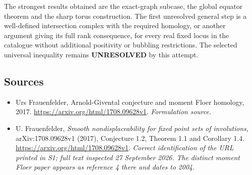 \documentclass[11pt]{article}
\begin{document}
The strongest results obtained are the exact-graph subcase, the global equator theorem and the sharp torus construction. The first unresolved general step is a well-defined intersection complex with the required homology, or another argument giving its full rank consequence, for every real fixed locus in the catalogue without additional positivity or bubbling restrictions. The selected universal inequality remains \textbf{UNRESOLVED} by this attempt.

\subsection{Sources}
\begin{itemize}
\item[S1]Urs Frauenfelder, Arnold-Givental conjecture and moment Floer homology, 2017.
\url{https://arxiv.org/html/1708.09628v1}.
\textit{Formulation source.}
\item[E1]U. Frauenfelder, \emph{Smooth nondisplaceability for fixed point sets of involutions}, arXiv:1708.09628v1 (2017), Conjecture 1.2, Theorem 1.1 and Corollary 1.4.
\url{https://arxiv.org/html/1708.09628v1}.
\textit{Correct identification of the URL printed in S1; full text inspected 27 September 2026. The distinct moment Floer paper appears as reference 4 there and dates to 2004.}
\end{itemize}
\end{document}
